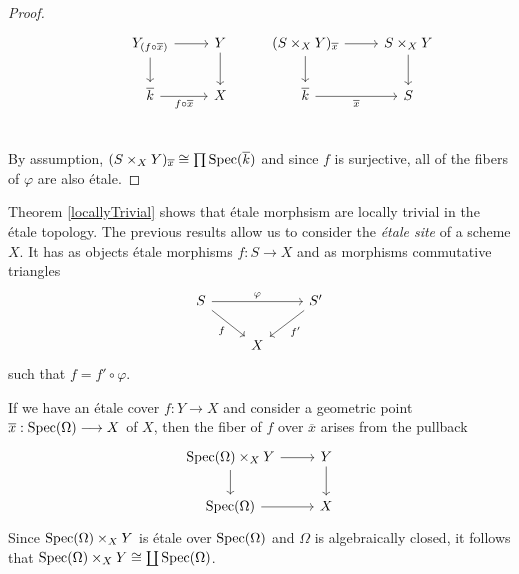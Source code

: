 \begin{proof}
\[\begin{tikzcd}
	& {Y_{(f \circ \overline{x})}} & Y & {(S \times_X Y)_{\overline{x}}} & {S \times_X Y} \\
	& {\overline{k}} & X & {\overline{k}} & S \\
	{}
	\arrow[from=1-3, to=2-3]
	\arrow[from=1-2, to=1-3]
	\arrow["{f \circ \overline{x}}"', from=2-2, to=2-3]
	\arrow[from=1-2, to=2-2]
	\arrow[from=1-4, to=2-4]
	\arrow[from=1-4, to=1-5]
	\arrow[from=1-5, to=2-5]
	\arrow["{\overline{x}}"', from=2-4, to=2-5]
\end{tikzcd}
\]
By assumption, $(S\times_X Y)_{\overline{x}} \cong \prod \operatorname{Spec}(\overline{k})$ and since $f$ is surjective, all of the fibers of $\varphi$ are also \'etale.
\end{proof}
Theorem \ref{locallyTrivial} shows that \'etale morphsism are locally trivial in the \'etale topology.
The previous results allow us to consider the \textit{\'etale site} of a scheme $X$. It has as objects \'etale morphisms $f: S \to X$ and as morphisms commutative triangles
\[
\begin{tikzcd}
	S && {S'} \\
	& X
	\arrow["\varphi", from=1-1, to=1-3]
	\arrow["{f'}", from=1-3, to=2-2]
	\arrow["f"', from=1-1, to=2-2]
\end{tikzcd}
\]
 such that $f = f' \circ \varphi$. 

\begin{theorem}
  
\end{theorem}

\begin{remark}
  If we have an \'etale cover $f: Y \to X$ and consider a geometric point $\overline{x} : \operatorname{Spec}(\Omega) \longrightarrow X$ of $X$, then the fiber of $f$ over $\overline{x}$ arises from the pullback
    \[\begin{tikzcd}
    	{\Spec(\Omega)\times_X Y} & Y \\
    	{\Spec(\Omega)} & X
    	\arrow[from=1-1, to=2-1]
    	\arrow[from=1-1, to=1-2]
    	\arrow[from=1-2, to=2-2]
    	\arrow[from=2-1, to=2-2]
    \end{tikzcd}\]
  Since $\operatorname{Spec}(\Omega)\times_X Y$ is \'etale over $\operatorname{Spec}(\Omega)$ and $\Omega$ is algebraically closed, it follows that $\operatorname{Spec}(\Omega)\times_X Y \cong \coprod \operatorname{Spec}(\Omega)$.
\end{remark}

